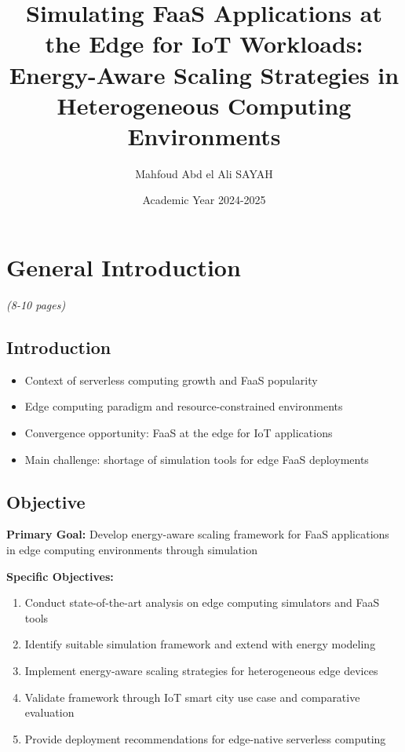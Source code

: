 \documentclass[12pt,a4paper]{report}
\begin{document}

\title{Simulating FaaS Applications at the Edge for IoT Workloads: \\
Energy-Aware Scaling Strategies in Heterogeneous Computing Environments}
\author{Mahfoud Abd el Ali SAYAH}
\date{Academic Year 2024-2025}

\maketitle
\tableofcontents


\chapter{General Introduction}
\textit{(8-10 pages)}

\section{Introduction}
\begin{itemize}[leftmargin=1cm]
    \item Context of serverless computing growth and FaaS popularity
    \item Edge computing paradigm and resource-constrained environments
    \item Convergence opportunity: FaaS at the edge for IoT applications
    \item Main challenge: shortage of simulation tools for edge FaaS deployments
\end{itemize}

\section{Objective}
\textbf{Primary Goal:} Develop energy-aware scaling framework for FaaS applications in edge computing environments through simulation

\textbf{Specific Objectives:}
\begin{enumerate}[leftmargin=1cm]
    \item Conduct state-of-the-art analysis on edge computing simulators and FaaS tools
    \item Identify suitable simulation framework and extend with energy modeling
    \item Implement energy-aware scaling strategies for heterogeneous edge devices
    \item Validate framework through IoT smart city use case and comparative evaluation
    \item Provide deployment recommendations for edge-native serverless computing
\end{enumerate}
\end{document}

